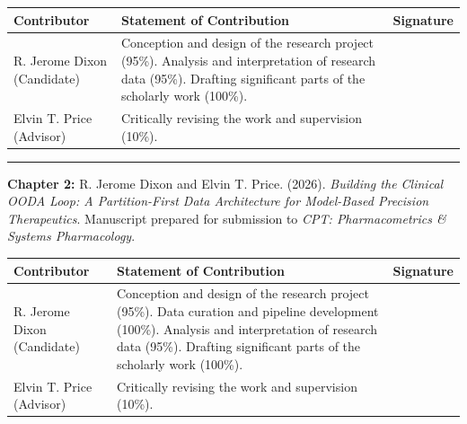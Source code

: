 \documentclass[
  12pt,
]{book}
\begin{document}
\begin{longtable}[]{@{}
  >{\raggedright\arraybackslash}p{}
  >{\raggedright\arraybackslash}p{}
  >{\raggedright\arraybackslash}p{}@{}}
\toprule\noalign{}
\begin{minipage}[b]{\linewidth}\raggedright
Contributor
\end{minipage} & \begin{minipage}[b]{\linewidth}\raggedright
Statement of Contribution
\end{minipage} & \begin{minipage}[b]{\linewidth}\raggedright
Signature
\end{minipage} \\
\midrule\noalign{}
\endhead
\bottomrule\noalign{}
\endlastfoot
R. Jerome Dixon (Candidate) & Conception and design of the research
project (95\%). Analysis and interpretation of research data (95\%).
Drafting significant parts of the scholarly work (100\%). & \\
Elvin T. Price (Advisor) & Critically revising the work and supervision
(10\%). & \\
\end{longtable}

\begin{center}\rule{0.5\linewidth}{0.5pt}\end{center}

\textbf{Chapter 2:} R. Jerome Dixon and Elvin T. Price. (2026).
\emph{Building the Clinical OODA Loop: A Partition-First Data
Architecture for Model-Based Precision Therapeutics}. Manuscript
prepared for submission to \emph{CPT: Pharmacometrics \& Systems
Pharmacology}.

\begin{longtable}[]{@{}
  >{\raggedright\arraybackslash}p{}
  >{\raggedright\arraybackslash}p{}
  >{\raggedright\arraybackslash}p{}@{}}
\toprule\noalign{}
\begin{minipage}[b]{\linewidth}\raggedright
Contributor
\end{minipage} & \begin{minipage}[b]{\linewidth}\raggedright
Statement of Contribution
\end{minipage} & \begin{minipage}[b]{\linewidth}\raggedright
Signature
\end{minipage} \\
\midrule\noalign{}
\endhead
\bottomrule\noalign{}
\endlastfoot
R. Jerome Dixon (Candidate) & Conception and design of the research
project (95\%). Data curation and pipeline development (100\%). Analysis
and interpretation of research data (95\%). Drafting significant parts
of the scholarly work (100\%). & \\
Elvin T. Price (Advisor) & Critically revising the work and supervision
(10\%). & \\
\end{longtable}
\end{document}
